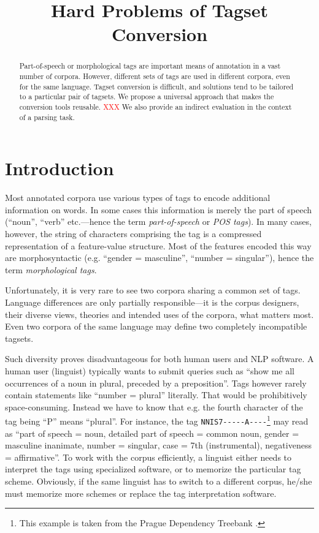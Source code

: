 \documentclass[11pt]{article}
\title{Hard Problems of Tagset Conversion%
}
\author{%
}
\date{}
\newcommand{\XXX}{\textcolor{red}{XXX }} %
\begin{document}
\maketitle
\thispagestyle{fancy}

\begin{abstract}
Part-of-speech or morphological tags are important means of annotation in a vast number of corpora. However, different sets of tags are used in different corpora, even for the same language. Tagset conversion is difficult, and solutions tend to be tailored to a particular pair of tagsets. We propose a universal approach that makes the conversion tools reusable. \XXX We also provide an indirect evaluation in the context of a parsing task.
\end{abstract}

\section{Introduction}
\label{sec:intro}

Most annotated corpora use various types of tags to encode additional information on words. In some cases this information is merely the part of speech (“noun”, “verb” etc.—hence the term \textit{part-of-speech} or \textit{POS tags}). In many cases, however, the string of characters comprising the tag is a compressed representation of a feature-value structure. Most of the features encoded this way are morphosyntactic (e.g. “gender = masculine”, “number = singular”), hence the term \textit{morphological tags}.

Unfortunately, it is very rare to see two corpora sharing a common set of tags. Language differences are only partially responsible—it is the corpus designers, their diverse views, theories and intended uses of the corpora, what matters most. Even two corpora of the same language may define two completely incompatible tagsets.

Such diversity proves disadvantageous for both human users and NLP software. A human user (linguist) typically wants to submit queries such as “show me all occurrences of a noun in plural, preceded by a preposition”. Tags however rarely contain statements like “number = plural” literally. That would be prohibitively space-consuming. Instead we have to know that e.g. the fourth character of the tag being “P” means “plural”. For instance, the tag \texttt{NNIS7-{}-{}-{}-{}-A-{}-{}-{}-}\footnote{This example is taken from the Prague Dependency Treebank \citep{pdt}.} may read as “part of speech = noun, detailed part of speech = common noun, gender = masculine inanimate, number = singular, case = 7th (instrumental), negativeness = affirmative”. To work with the corpus efficiently, a linguist either needs to interpret the tags using specialized software, or to memorize the particular tag scheme. Obviously, if the same linguist has to switch to a different corpus, he/she must memorize more schemes or replace the tag interpretation software.
\end{document}
